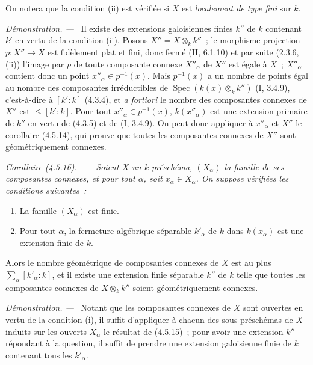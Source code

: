 \documentclass[10pt,oneside]{book}
\newenvironment{corollary}[1][]{%
  \par\medskip\noindent\itshape Corollaire (#1). ---\ }{\par}
\newenvironment{proof}{%
  \par\medskip\noindent\textit{Démonstration. ---\ }}{\par}
\begin{document}
On notera que la condition (ii) est vérifiée si $X$ est \emph{localement de
type fini} sur $k$.

\begin{proof}
Il existe des extensions galoisiennes finies $k''$ de $k$ contenant $k'$ en
vertu de la condition (ii). Posons $X''=X\otimes_k k''$~; le morphisme
projection $p:X''\to X$ est fidèlement plat et fini, donc fermé (II, 6.1.10) et
par suite (2.3.6, (ii)) l'image par $p$ de toute composante connexe $X''_\alpha$
de $X''$ est égale à $X$~; $X''_\alpha$ contient donc un point
$x''_\alpha\in p^{-1}(x)$. Mais $p^{-1}(x)$ a un nombre de points égal au
nombre des composantes irréductibles de
$\operatorname{Spec}(k(x)\otimes_k k'')$ (I, 3.4.9), c'est-à-dire à $[k':k]$
(4.3.4), et \emph{a fortiori} le nombre des composantes connexes de $X''$ est
$\leqslant[k':k]$. Pour tout $x''_\alpha\in p^{-1}(x)$, $k(x''_\alpha)$ est une
extension primaire de $k''$ en vertu de (4.3.5) et de (I, 3.4.9). On peut donc
appliquer à $x''_\alpha$ et $X''$ le corollaire (4.5.14), qui prouve que toutes
les composantes connexes de $X''$ sont géométriquement connexes.
\end{proof}

\begin{corollary}[4.5.16]
\label{IV.2.4.5.16-fr}
Soient $X$ un $k$-préschéma, $(X_\alpha)$ la famille de ses composantes
connexes, et pour tout $\alpha$, soit $x_\alpha\in X_\alpha$. On suppose
vérifiées les conditions suivantes~:
\begin{enumerate}
\item[(i)] La famille $(X_\alpha)$ est finie.
\item[(ii)] Pour tout $\alpha$, la fermeture algébrique séparable $k'_\alpha$
de $k$ dans $k(x_\alpha)$ est une extension finie de $k$.
\end{enumerate}
Alors le nombre géométrique de composantes connexes de $X$ est au plus
$\sum_\alpha[k'_\alpha:k]$, et il existe une extension finie séparable $k''$ de
$k$ telle que toutes les composantes connexes de $X\otimes_k k''$ soient
géométriquement connexes.
\end{corollary}

\begin{proof}
Notant que les composantes connexes de $X$ sont ouvertes en vertu de la
condition (i), il suffit d'appliquer à chacun des sous-préschémas de $X$ induits
sur les ouverts $X_\alpha$ le résultat de (4.5.15)~; pour avoir une extension
$k''$ répondant à la question, il suffit de prendre une extension galoisienne
finie de $k$ contenant tous les $k'_\alpha$.
\end{proof}
\end{document}
